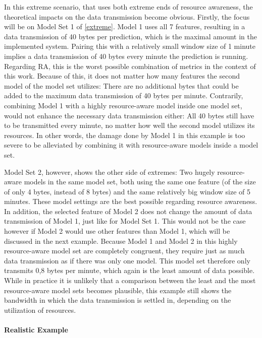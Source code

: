 In this extreme scenario, that uses both extreme ends of resource awareness, the theoretical impacts on the data transmission become obvious. Firstly, the focus will be on Model Set 1 of \autoref{extreme}. Model 1 uses all 7 features, resulting in a data transmission of 40 bytes per prediction, which is the maximal amount in the implemented system. Pairing this with a relatively small window size of 1 minute implies a data transmission of 40 bytes every minute the prediction is running. Regarding RA, this is the worst possible combination of metrics in the context of this work. Because of this, it does not matter how many features the second model of the model set utilizes: There are no additional bytes that could be added to the maximum data transmission of 40 bytes per minute. Contrarily, combining Model 1 with a highly resource-aware model inside one model set, would not enhance the necessary data transmission either: All 40 bytes still have to be transmitted every minute, no matter how well the second model utilizes its resources. In other words, the damage done by Model 1 in this example is too severe to be alleviated by combining it with resource-aware models inside a model set.

Model Set 2, however, shows the other side of extremes: Two hugely resource-aware models in the same model set, both using the same one feature (of the size of only 4 bytes, instead of 8 bytes) and the same relatively big window size of 5 minutes. These model settings are the best possible regarding resource awareness. In addition, the selected feature of Model 2 does not change the amount of data transmission of Model 1, just like for Model Set 1. This would not be the case however if Model 2 would use other features than Model 1, which will be discussed in the next example. Because Model 1 and Model 2 in this highly resource-aware model set are completely congruent, they require just as much data transmission as if there was only one model. This model set therefore only transmits 0,8 bytes per minute, which again is the least amount of data possible. While in practice it is unlikely that a comparison between the least and the most resource-aware model sets becomes plausible, this example still shows the bandwidth in which the data transmission is settled in, depending on the utilization of resources.

\paragraph{Realistic Example}

